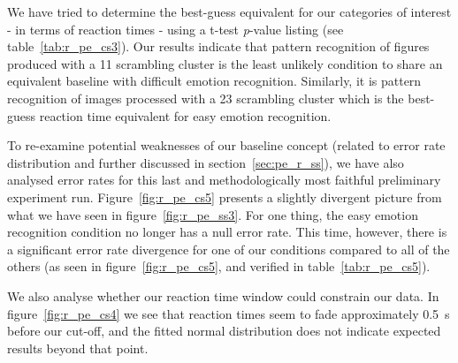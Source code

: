 	    We have tried to determine the best-guess equivalent for our categories of interest - in terms of reaction times - using a t-test \textit{p}-value listing (see table~\ref{tab:r_pe_cs3}).
	    Our results indicate that pattern recognition of figures produced with a \SI{11}{\pixel} scrambling cluster is the least unlikely condition to share an equivalent baseline with difficult emotion recognition.
	    Similarly, it is pattern recognition of images processed with a \SI{23}{\pixel} scrambling cluster which is the best-guess reaction time equivalent for easy emotion recognition.
	    
	    
	    To re-examine potential weaknesses of our baseline concept (related to error rate distribution and further discussed in section~\ref{sec:pe_r_ss}), we have also analysed error rates for this last and methodologically most faithful preliminary experiment run.
	    Figure~\ref{fig:r_pe_cs5} presents a slightly divergent picture from what we have seen in figure~\ref{fig:r_pe_ss3}.
	    For one thing, the easy emotion recognition condition no longer has a null error rate.
	    This time, however, there is a significant error rate divergence for one of our conditions compared to all of the others (as seen in figure~\ref{fig:r_pe_cs5}, and verified in table~\ref{tab:r_pe_cs5}).
	
	    We also analyse whether our reaction time window could constrain our data.
	    In figure~\ref{fig:r_pe_cs4} we see that reaction times seem to fade approximately \SI{0.5}{\second} before our cut-off, and the fitted normal distribution does not indicate expected results beyond that point.
	    
